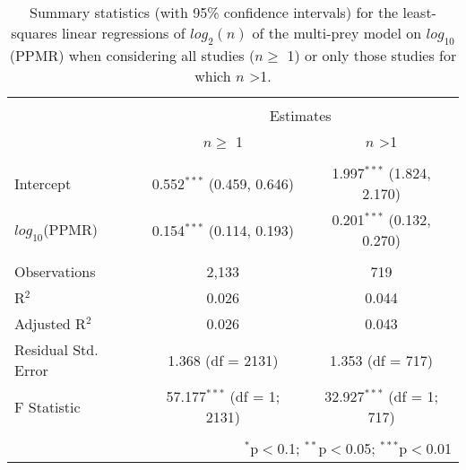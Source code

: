 
\begin{table}[!htbp] \centering 
  \caption{Summary statistics (with 95\% confidence intervals) for the least-squares linear regressions of $log_2(n)$ of the multi-prey model on $log_{10}$(PPMR) when considering all studies ($n \geq$ 1) or only those studies for which $n$ \textgreater 1.} 
  \label{tab:n-ppmr} 
\begin{tabular}{@{\extracolsep{5pt}}lcc} 
\\[-1.8ex]\hline 
\hline \\[-1.8ex] 
 & \multicolumn{2}{c}{Estimates} \\ 
\cline{2-3} 
 & $n \geq$ 1 & $n$ \textgreater 1 \\ 
\hline \\[-1.8ex] 
 Intercept & 0.552$^{***}$ (0.459, 0.646) & 1.997$^{***}$ (1.824, 2.170) \\ 
  $log_{10}$(PPMR) & 0.154$^{***}$ (0.114, 0.193) & 0.201$^{***}$ (0.132, 0.270) \\ 
 \hline \\[-1.8ex] 
Observations & 2,133 & 719 \\ 
R$^{2}$ & 0.026 & 0.044 \\ 
Adjusted R$^{2}$ & 0.026 & 0.043 \\ 
Residual Std. Error & 1.368 (df = 2131) & 1.353 (df = 717) \\ 
F Statistic & 57.177$^{***}$ (df = 1; 2131) & 32.927$^{***}$ (df = 1; 717) \\ 
\hline 
\hline \\[-1.8ex] 
\multicolumn{3}{r}{$^{*}$p$<$0.1; $^{**}$p$<$0.05; $^{***}$p$<$0.01} \\ 
\end{tabular} 
\end{table} 
